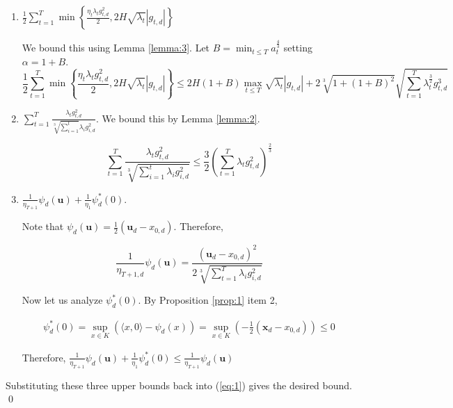 \documentclass{article}
\newcommand{\bx}{\mathbf{x}}
\newcommand{\bu}{\mathbf{u}}
\begin{document}
\begin{enumerate}
\item $\frac{1}{2}\sum\limits_{t=1}^T \min \left\{\frac{\eta_t \lambda_t g_{t,d}^2}{2}, 2H\sqrt{\lambda_t}|g_{t,d}|\right\}$

  We bound this using Lemma \ref{lemma:3}. Let $B = \min_{t\leq T}a_{t}^\frac{4}{3}$ setting $\alpha = 1+B$.
  \[
    \frac{1}{2}\sum\limits_{t=1}^T \min \left\{\frac{\eta_t \lambda_t g_{t,d}^2}{2}, 2H\sqrt{\lambda_t}|g_{t,d}|\right\}
    \leq 2H(1+B)\max_{t\leq T}\sqrt{\lambda_t}|g_{t,d}| +
    2\sqrt[3]{1 + (1+B)^2}\sqrt{\sum\limits_{t=1}^T \lambda_{t}^\frac{3}{2} g_{t,d}^3}
  \]
\item $\sum\limits_{t=1}^T \frac{\lambda_t g_{t,d}^2}{\sqrt[3]{\sum\limits_{i=1}^t}\lambda_i g_{i,d}^2}$. We bound this
  by Lemma \ref{lemma:2}.

  \[
    \sum\limits_{t=1}^T \frac{\lambda_t g_{t,d}^2}{\sqrt[3]{\sum\limits_{i=1}^t\lambda_i g_{i,d}^2}} \leq \frac{3}{2}
    \left(\sum\limits_{t=1}^T \lambda_t g_{t,d}^2\right)^\frac{2}{3}
  \]
\item $\frac{1}{\eta_{T+1}}\psi_{d}(\bu) + \frac{1}{\eta_1}\psi_{d}^*(0)$.

  Note that $\psi_d(\bu) = \frac{1}{2}(\bu_d - x_{0,d})$. Therefore,

  \[
    \frac{1}{\eta_{T+1,d}}\psi_d(\bu) = \frac{(\bu_d - x_{0,d})^2}{2 \sqrt[3]{\sum\limits_{t=1}^T \lambda_i g_{i,d}^2}}
  \]

  Now let us analyze $\psi_d^*(0)$. By Proposition \ref{prop:1} item 2,

  \begin{align*}
    \psi_d^*(0) = \sup\limits_{x \in K}(\langle x , 0 \rangle - \psi_d(x)) = \sup_{x \in K}(-\frac{1}{2}(\bx_d -
    x_{0,d})) \leq 0
  \end{align*}

  Therefore, $\frac{1}{\eta_{T+1}}\psi_{d}(\bu) + \frac{1}{\eta_1}\psi_{d}^*(0) \leq \frac{1}{\eta_{T+1}}\psi_{d}(\bu)$
\end{enumerate}

Substituting these three upper bounds back into (\ref{eq:1}) gives the desired bound. \\
\qed



\end{document}
